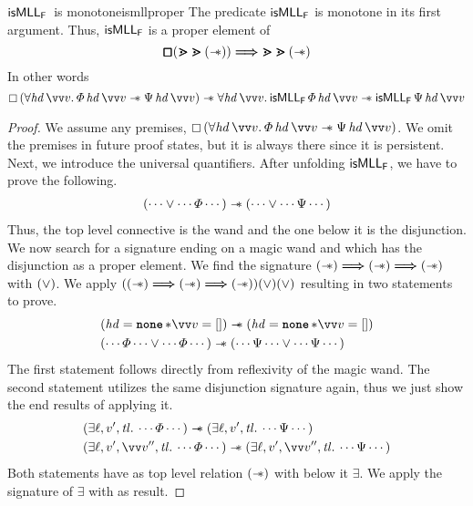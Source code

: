 \documentclass[thesis.tex]{subfiles}
\begin{document}
\begin{example}{$\textsf{\upshape isMLL}_{\textsf{\upshape F}}$\ is monotone}{ismllproper}
  The predicate $\textsf{\upshape isMLL}_{\textsf{\upshape F}}$ is monotone in its first argument. Thus, $\textsf{\upshape isMLL}_{\textsf{\upshape F}}$ is a proper element of
  \[
    \pmb{\mathop{\boxempty}} (\bm{\gtrdot} \bm{\gtrdot} (\mathrel{-\!\!\ast})) \mathrel{\bm{\Longrightarrow}} \bm{\gtrdot} \bm{\gtrdot} (\mathrel{-\!\!\ast})
  \]
  In other words
  \[
    \always{(\All \hd\, \vect{v}. \pred\, \hd\, \vect{v} \wand \predB\, \hd\, \vect{v})} \wand \All \hd\, \vect{v}. \isMLL_\hopred\, \pred\, \hd\, \vect{v} \wand \isMLL_\hopred\, \predB\, \hd\, \vect{v}
  \]


  \begin{proof}
    We assume any premises, $\always{(\All \hd\, \vect{v}. \pred\, \hd\, \vect{v} \wand \predB\, \hd\, \vect{v})}$. We omit the premises in future proof states, but it is always there since it is persistent. Next, we introduce the universal quantifiers. After unfolding $\textsf{\upshape isMLL}_{\textsf{\upshape F}}$, we have to prove the following.
    \begin{align*}
      (\cdots \lor \cdots \varPhi \cdots) \mathrel{-\!\!\ast} (\cdots \lor \cdots \Psi \cdots)
    \end{align*}
    Thus, the top level connective is the wand and the one below it is the disjunction. We now search for a signature ending on a magic wand and which has the disjunction as a proper element. We find the signature ${(\mathrel{-\!\!\ast}) \mathrel{\bm{\Longrightarrow}} (\mathrel{-\!\!\ast}) \mathrel{\bm{\Longrightarrow}} (\mathrel{-\!\!\ast})}$ with $(\lor)$. We apply $((\mathrel{-\!\!\ast}) \mathrel{\bm{\Longrightarrow}} (\mathrel{-\!\!\ast}) \mathrel{\bm{\Longrightarrow}} (\mathrel{-\!\!\ast})) (\lor) (\lor)$ resulting in two statements to prove.
    \begin{align*}
       & (\hd = \None * \vect{\val} = []) \wand (\hd = \None * \vect{\val} = [])                                \\
       & (\cdots \pred \cdots \lor \cdots  \pred \cdots) \wand (\cdots \predB \cdots \lor \cdots \predB \cdots)
    \end{align*}
    The first statement follows directly from reflexivity of the magic wand. The second statement utilizes the same disjunction signature again, thus we just show the end results of applying it.
    \begin{align*}
       & (\Exists \loc, \val', \tl. \cdots \pred \cdots) \wand (\Exists \loc, \val', \tl. \cdots \predB \cdots)                               \\
       & (\Exists \loc, \val', \vect{\val}'', \tl. \cdots \pred \cdots) \wand (\Exists \loc, \val', \vect{\val}'', \tl. \cdots \predB \cdots)
    \end{align*}
    Both statements have as top level relation $(\mathrel{-\!\!\ast})$ with below it $\exists$. We apply the signature of $\exists$ with as result.

\end{proof}
\end{example}
\end{document}

